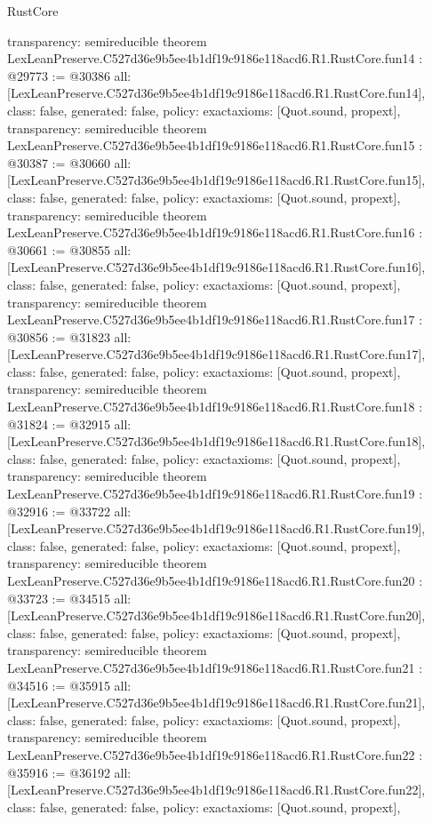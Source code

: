 \begin{lexlean}{RustCore}
\begin{coremodule}
{  transparency: semireducible
}
theorem LexLeanPreserve.C527d36e9b5ee4b1df19c9186e118acd6.R1.RustCore.fun14 : @29773 := @30386 {
  all: [LexLeanPreserve.C527d36e9b5ee4b1df19c9186e118acd6.R1.RustCore.fun14],
  class: false,
  generated: false,
  policy: exact{axioms: [Quot.sound, propext]},
  transparency: semireducible
}
theorem LexLeanPreserve.C527d36e9b5ee4b1df19c9186e118acd6.R1.RustCore.fun15 : @30387 := @30660 {
  all: [LexLeanPreserve.C527d36e9b5ee4b1df19c9186e118acd6.R1.RustCore.fun15],
  class: false,
  generated: false,
  policy: exact{axioms: [Quot.sound, propext]},
  transparency: semireducible
}
theorem LexLeanPreserve.C527d36e9b5ee4b1df19c9186e118acd6.R1.RustCore.fun16 : @30661 := @30855 {
  all: [LexLeanPreserve.C527d36e9b5ee4b1df19c9186e118acd6.R1.RustCore.fun16],
  class: false,
  generated: false,
  policy: exact{axioms: [Quot.sound, propext]},
  transparency: semireducible
}
theorem LexLeanPreserve.C527d36e9b5ee4b1df19c9186e118acd6.R1.RustCore.fun17 : @30856 := @31823 {
  all: [LexLeanPreserve.C527d36e9b5ee4b1df19c9186e118acd6.R1.RustCore.fun17],
  class: false,
  generated: false,
  policy: exact{axioms: [Quot.sound, propext]},
  transparency: semireducible
}
theorem LexLeanPreserve.C527d36e9b5ee4b1df19c9186e118acd6.R1.RustCore.fun18 : @31824 := @32915 {
  all: [LexLeanPreserve.C527d36e9b5ee4b1df19c9186e118acd6.R1.RustCore.fun18],
  class: false,
  generated: false,
  policy: exact{axioms: [Quot.sound, propext]},
  transparency: semireducible
}
theorem LexLeanPreserve.C527d36e9b5ee4b1df19c9186e118acd6.R1.RustCore.fun19 : @32916 := @33722 {
  all: [LexLeanPreserve.C527d36e9b5ee4b1df19c9186e118acd6.R1.RustCore.fun19],
  class: false,
  generated: false,
  policy: exact{axioms: [Quot.sound, propext]},
  transparency: semireducible
}
theorem LexLeanPreserve.C527d36e9b5ee4b1df19c9186e118acd6.R1.RustCore.fun20 : @33723 := @34515 {
  all: [LexLeanPreserve.C527d36e9b5ee4b1df19c9186e118acd6.R1.RustCore.fun20],
  class: false,
  generated: false,
  policy: exact{axioms: [Quot.sound, propext]},
  transparency: semireducible
}
theorem LexLeanPreserve.C527d36e9b5ee4b1df19c9186e118acd6.R1.RustCore.fun21 : @34516 := @35915 {
  all: [LexLeanPreserve.C527d36e9b5ee4b1df19c9186e118acd6.R1.RustCore.fun21],
  class: false,
  generated: false,
  policy: exact{axioms: [Quot.sound, propext]},
  transparency: semireducible
}
theorem LexLeanPreserve.C527d36e9b5ee4b1df19c9186e118acd6.R1.RustCore.fun22 : @35916 := @36192 {
  all: [LexLeanPreserve.C527d36e9b5ee4b1df19c9186e118acd6.R1.RustCore.fun22],
  class: false,
  generated: false,
  policy: exact{axioms: [Quot.sound, propext]},
}
\end{coremodule}
\end{lexlean}
